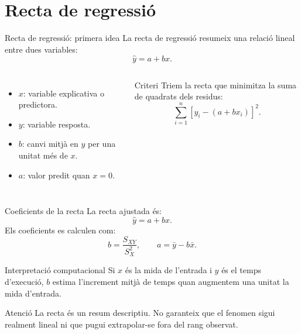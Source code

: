\documentclass[10pt,aspectratio=169]{beamer}
\begin{document}
\section{Recta de regressió}

\begin{frame}{Recta de regressió: primera idea}
La recta de regressió resumeix una relació lineal entre dues variables:
\[
 \widehat{y}=a+bx.
\]
\vspace{0.1cm}
\begin{columns}[T]
\begin{itemize}
  \item $x$: variable explicativa o predictora.
  \item $y$: variable resposta.
  \item $b$: canvi mitjà en $y$ per una unitat més de $x$.
  \item $a$: valor predit quan $x=0$.
\end{itemize}
\begin{block}{Criteri}
Triem la recta que minimitza la suma de quadrats dels residus:
\[
 \sum_{i=1}^n \left[y_i-(a+bx_i)\right]^2.
\]
\end{block}
\end{columns}
\end{frame}

\begin{frame}{Coeficients de la recta}
La recta ajustada és:
\[
 \widehat{y}=a+bx.
\]
Els coeficients es calculen com:
\[
 b=\frac{S_{XY}}{S_X^2},\qquad a=\bar{y}-b\bar{x}.
\]
\vspace{0.2cm}
\begin{block}{Interpretació computacional}
Si $x$ és la mida de l'entrada i $y$ és el temps d'execució, $b$ estima l'increment mitjà de temps quan augmentem una unitat la mida d'entrada.
\end{block}
\begin{alertblock}{Atenció}
La recta és un resum descriptiu. No garanteix que el fenomen sigui realment lineal ni que pugui extrapolar-se fora del rang observat.
\end{alertblock}
\end{frame}
\end{document}
